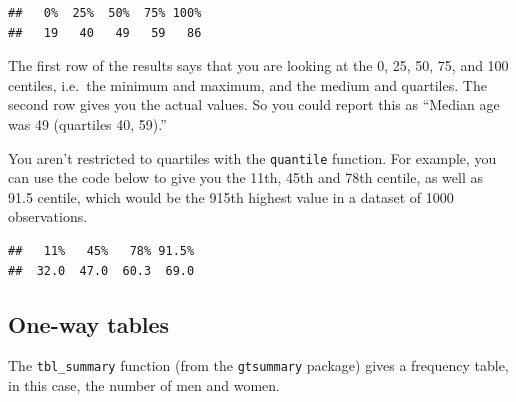 \documentclass[]{book}
\newenvironment{Shaded}{\begin{snugshade}}{\end{snugshade}}
\newcommand{\CommentTok}[1]{\textcolor[rgb]{0.56,0.35,0.01}{\textit{#1}}}
\newcommand{\DataTypeTok}[1]{\textcolor[rgb]{0.13,0.29,0.53}{#1}}
\newcommand{\FloatTok}[1]{\textcolor[rgb]{0.00,0.00,0.81}{#1}}
\newcommand{\KeywordTok}[1]{\textcolor[rgb]{0.13,0.29,0.53}{\textbf{#1}}}
\newcommand{\NormalTok}[1]{#1}
\newcommand{\OperatorTok}[1]{\textcolor[rgb]{0.81,0.36,0.00}{\textbf{#1}}}
\newcommand{\OtherTok}[1]{\textcolor[rgb]{0.56,0.35,0.01}{#1}}
\newcommand{\StringTok}[1]{\textcolor[rgb]{0.31,0.60,0.02}{#1}}
\begin{document}
\begin{verbatim}
##   0%  25%  50%  75% 100% 
##   19   40   49   59   86
\end{verbatim}

The first row of the results says that you are looking at the 0, 25, 50, 75, and 100 centiles, i.e.~the minimum and maximum, and the medium and quartiles. The second row gives you the actual values. So you could report this as ``Median age was 49 (quartiles 40, 59).''

You aren't restricted to quartiles with the \texttt{quantile} function. For example, you can use the code below to give you the 11th, 45th and 78th centile, as well as 91.5 centile, which would be the 915th highest value in a dataset of 1000 observations.

\begin{Shaded}
\end{Shaded}

\begin{verbatim}
##   11%   45%   78% 91.5% 
##  32.0  47.0  60.3  69.0
\end{verbatim}

\hypertarget{one-way-tables}{%
\subsection{One-way tables}\label{one-way-tables}}

The \texttt{tbl\_summary} function (from the \texttt{gtsummary} package) gives a frequency table, in this case, the number of men and women.

\begin{Shaded}
\end{Shaded}
\end{document}
